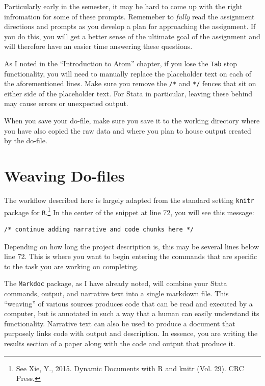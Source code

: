 \documentclass[]{book}
\let\rmarkdownfootnote\footnote%
\def\footnote{\protect\rmarkdownfootnote}
\begin{document}
Particularly early in the semester, it may be hard to come up with the
right infromation for some of these prompts. Rememeber to \emph{fully}
read the assignment directions and prompts as you develop a plan for
approaching the assignment. If you do this, you will get a better sense
of the ultimate goal of the assignment and will therefore have an easier
time answering these questions.

As I noted in the ``Introduction to Atom'' chapter, if you lose the
\texttt{Tab} stop functionality, you will need to manually replace the
placeholder text on each of the aforementioned lines. Make sure you
remove the \texttt{/*} and \texttt{*/} fences that sit on either side of
the placeholder text. For Stata in particular, leaving these behind may
cause errors or unexpected output.

When you save your do-file, make sure you save it to the working
directory where you have also copied the raw data and where you plan to
house output created by the do-file.

\section{Weaving Do-files}\label{weaving-do-files}

The workflow described here is largely adapted from the standard setting
\texttt{knitr} package for \texttt{R}.\footnote{See Xie, Y., 2015.
  Dynamic Documents with R and knitr (Vol. 29). CRC Press.} In the
center of the snippet at line 72, you will see this message:

\begin{verbatim}
/* continue adding narrative and code chunks here */
\end{verbatim}

Depending on how long the project description is, this may be several
lines below line 72. This is where you want to begin entering the
commands that are specific to the task you are working on completing.

The \texttt{Markdoc} package, as I have already noted, will combine your
Stata commands, output, and narrative text into a single markdown file.
This ``weaving'' of various sources produces code that can be read and
executed by a computer, but is annotated in such a way that a human can
easily understand its functionality. Narrative text can also be used to
produce a document that purposely links code with output and
description. In essence, you are writing the results section of a paper
along with the code and output that produce it.
\end{document}
